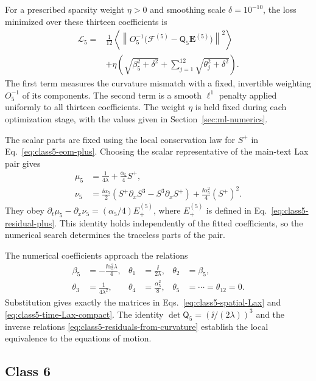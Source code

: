 For a prescribed sparsity weight $\eta>0$ and smoothing scale
$\delta=10^{-10}$, the loss minimized over these thirteen coefficients is
\begin{align}
\mathcal L_5
={}&\frac{1}{12}\left\langle\left\|
O_5^{-1}
\bigl(\boldsymbol{\mathcal F}^{(5)}-\mathsf Q_5\boldsymbol E^{(5)}\bigr)
\right\|^2\right\rangle
\nonumber\\
&+\eta\left(\sqrt{\beta_5^2+\delta^2}
 +\sum_{j=1}^{12}\sqrt{\theta_j^2+\delta^2}\right).
\label{eq:ml-class5-loss}
\end{align}
The first term measures the curvature mismatch with a fixed, invertible
weighting $O_5^{-1}$ of its components.  The second term is a smooth
$\ell^1$ penalty applied uniformly to all thirteen coefficients.  The weight
$\eta$ is held fixed during each optimization stage, with the values
given in Section~\ref{sec:ml-numerics}.

The scalar parts are fixed using the local conservation law for $S^+$
in Eq.~\eqref{eq:class5-eom-plus}.  Choosing the scalar representative
of the main-text Lax pair gives
\begin{align}
\mu_5&=\frac{1}{4\lambda}+\frac{\alpha_5}{4}S^+,
\nonumber\\
\nu_5&=\frac{\ii\alpha_5}{2}
 (S^+\partial_xS^3-S^3\partial_xS^+)
 +\frac{\ii\alpha_5^2}{4}(S^+)^2.
\label{eq:ml-class5-scalars}
\end{align}
They obey
$\partial_t\mu_5-\partial_x\nu_5=(\alpha_5/4)E^{(5)}_+$,
where $E^{(5)}_+$ is defined in Eq.~\eqref{eq:class5-residual-plus}.
This identity holds independently of the fitted coefficients, so the
numerical search determines the traceless parts of the pair.

The numerical coefficients approach the relations
\begin{align}
\beta_5&=-\frac{\ii\alpha_5^2\lambda}{4},
&\theta_1&=\frac{\ii}{2\lambda},
&\theta_2&=\beta_5,
\nonumber\\
\theta_3&=\frac{1}{4\lambda^2},
&\theta_4&=\frac{\alpha_5^2}{8},
&\theta_5&=\cdots=\theta_{12}=0.
\label{eq:ml-class5-coefficients}
\end{align}
Substitution gives exactly the matrices in
Eqs.~\eqref{eq:class5-spatial-Lax} and
\eqref{eq:class5-time-Lax-compact}.  The identity
$\det\mathsf Q_5=(\ii/(2\lambda))^3$ and the inverse relations
\eqref{eq:class5-residuals-from-curvature} establish the local
equivalence to the equations of motion.

\subsection{Class 6}
\label{sec:ml-class6-paper}

